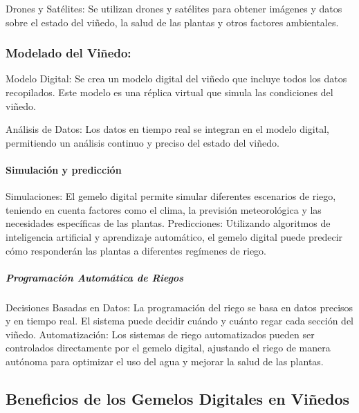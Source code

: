 \documentclass{article}
\begin{document}
Drones y Satélites: Se utilizan drones y satélites para obtener imágenes
y datos sobre el estado del viñedo, la salud de las plantas y otros
factores ambientales.

\hypertarget{modelado-del-viuxf1edo}{%
\subsubsection{Modelado del Viñedo:}\label{modelado-del-viuxf1edo}}

Modelo Digital: Se crea un modelo digital del viñedo que incluye todos
los datos recopilados. Este modelo es una réplica virtual que simula las
condiciones del viñedo.

Análisis de Datos: Los datos en tiempo real se integran en el modelo
digital, permitiendo un análisis continuo y preciso del estado del
viñedo.

\hypertarget{simulaciuxf3n-y-predicciuxf3n}{%
\paragraph{Simulación y
predicción}\label{simulaciuxf3n-y-predicciuxf3n}}

Simulaciones: El gemelo digital permite simular diferentes escenarios de
riego, teniendo en cuenta factores como el clima, la previsión
meteorológica y las necesidades específicas de las plantas.
Predicciones: Utilizando algoritmos de inteligencia artificial y
aprendizaje automático, el gemelo digital puede predecir cómo
responderán las plantas a diferentes regímenes de riego.

\hypertarget{programaciuxf3n-automuxe1tica-de-riegos}{%
\subparagraph{Programación Automática de
Riegos}\label{programaciuxf3n-automuxe1tica-de-riegos}}

Decisiones Basadas en Datos: La programación del riego se basa en datos
precisos y en tiempo real. El sistema puede decidir cuándo y cuánto
regar cada sección del viñedo. Automatización: Los sistemas de riego
automatizados pueden ser controlados directamente por el gemelo digital,
ajustando el riego de manera autónoma para optimizar el uso del agua y
mejorar la salud de las plantas.

\hypertarget{beneficios-de-los-gemelos-digitales-en-viuxf1edos}{%
\subsection{Beneficios de los Gemelos Digitales en
Viñedos}\label{beneficios-de-los-gemelos-digitales-en-viuxf1edos}}
\end{document}
